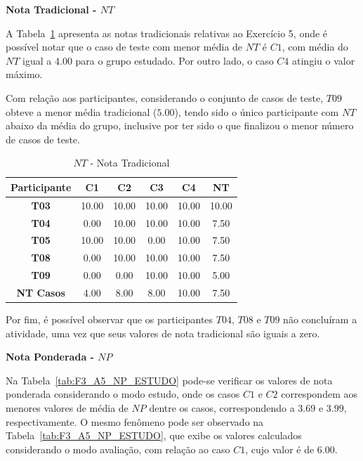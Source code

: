 \textbf{Nota Tradicional - $NT$}

A Tabela~\ref{tab:F3_A5_NT} apresenta as notas tradicionais relativas ao Exercício 5, onde é possível notar que o caso de teste com menor média de $NT$ é $C1$, com média do $NT$ igual a $4.00$ para o grupo estudado. Por outro lado, o caso $C4$ atingiu o valor máximo.

Com relação aos participantes, considerando o conjunto de casos de teste, $T09$ obteve a menor média tradicional ($5.00$), tendo sido o único participante com $NT$ abaixo da média do grupo, inclusive por ter sido o que finalizou o menor número de casos de teste.

\begin{table}[htbp]
	\centering
	\caption{$NT$ - Nota Tradicional}
	\begin{tabular}{|c|c|c|c|c|c|}
		\hline
		\rowcolor[HTML]{D9D9D9} 
		\textbf{Participante} & \textbf{C1} & \textbf{C2} & \textbf{C3} & \textbf{C4} & \textbf{NT} \\ \hline
		\rowcolor[HTML]{FFFFFF} 
		\textbf{T03} & 10.00 & 10.00 & 10.00 & 10.00 & 10.00 \\ \hline
		\rowcolor[HTML]{E7E6E6} 
		\textbf{T04} & 0.00 & 10.00 & 10.00 & 10.00 & 7.50 \\ \hline
		\rowcolor[HTML]{FFFFFF} 
		\textbf{T05} & 10.00 & 10.00 & 0.00 & 10.00 & 7.50 \\ \hline
		\rowcolor[HTML]{E7E6E6} 
		\textbf{T08} & 0.00 & 10.00 & 10.00 & 10.00 & 7.50 \\ \hline
		\rowcolor[HTML]{FFFFFF} 
		\textbf{T09} & 0.00 & 0.00 & 10.00 & 10.00 & 5.00 \\ \hline
		\rowcolor[HTML]{D9D9D9} 
		\textbf{NT Casos} & 4.00 & 8.00 & 8.00 & 10.00 & 7.50 \\ \hline
	\end{tabular}
	\label{tab:F3_A5_NT}
\end{table}

Por fim, é possível observar que os participantes $T04$, $T08$ e $T09$ não concluíram a atividade, uma vez que seus valores de nota tradicional são iguais a zero.

\textbf{Nota Ponderada - $NP$}

Na Tabela~\ref{tab:F3_A5_NP_ESTUDO} pode-se verificar os valores de nota ponderada considerando o modo estudo, onde os casos $C1$ e $C2$ correspondem aos menores valores de média de $NP$ dentre os casos, correspondendo a $3.69$ e $3.99$, respectivamente. O mesmo fenômeno pode ser observado na Tabela~\ref{tab:F3_A5_NP_ESTUDO}, que exibe os valores calculados considerando o modo avaliação, com relação ao caso $C1$, cujo valor é de $6.00$.

